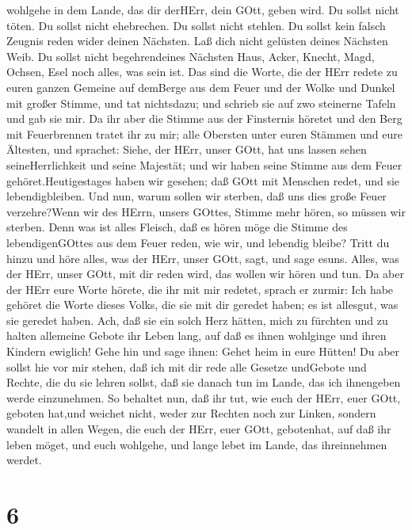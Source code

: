 wohlgehe in dem Lande, das dir derHErr, dein GOtt, geben wird.
 Du sollst nicht töten.  Du sollst nicht
ehebrechen.  Du sollst nicht stehlen.  Du
sollst kein falsch Zeugnis reden wider deinen Nächsten. 
Laß dich nicht gelüsten deines Nächsten Weib. Du sollst nicht
begehrendeines Nächsten Haus, Acker, Knecht, Magd, Ochsen, Esel noch
alles, was sein ist.  Das sind die Worte, die der HErr
redete zu euren ganzen Gemeine auf demBerge aus dem Feuer und der Wolke
und Dunkel mit großer Stimme, und tat nichtsdazu; und schrieb sie auf
zwo steinerne Tafeln und gab sie mir.  Da ihr aber die
Stimme aus der Finsternis höretet und den Berg mit Feuerbrennen tratet
ihr zu mir; alle Obersten unter euren Stämmen und eure Ältesten,
 und sprachet: Siehe, der HErr, unser GOtt, hat uns lassen
sehen seineHerrlichkeit und seine Majestät; und wir haben seine Stimme
aus dem Feuer gehöret.Heutigestages haben wir gesehen; daß GOtt mit
Menschen redet, und sie lebendigbleiben.  Und nun, warum
sollen wir sterben, daß uns dies große Feuer verzehre?Wenn wir des
HErrn, unsers GOttes, Stimme mehr hören, so müssen wir sterben.
 Denn was ist alles Fleisch, daß es hören möge die Stimme
des lebendigenGOttes aus dem Feuer reden, wie wir, und lebendig bleibe?
 Tritt du hinzu und höre alles, was der HErr, unser GOtt,
sagt, und sage esuns. Alles, was der HErr, unser GOtt, mit dir reden
wird, das wollen wir hören und tun.  Da aber der HErr eure
Worte hörete, die ihr mit mir redetet, sprach er zurmir: Ich habe
gehöret die Worte dieses Volks, die sie mit dir geredet haben; es ist
allesgut, was sie geredet haben.  Ach, daß sie ein solch
Herz hätten, mich zu fürchten und zu halten allemeine Gebote ihr Leben
lang, auf daß es ihnen wohlginge und ihren Kindern ewiglich!
 Gehe hin und sage ihnen: Gehet heim in eure Hütten!
 Du aber sollst hie vor mir stehen, daß ich mit dir rede
alle Gesetze undGebote und Rechte, die du sie lehren sollst, daß sie
danach tun im Lande, das ich ihnengeben werde einzunehmen. 
So behaltet nun, daß ihr tut, wie euch der HErr, euer GOtt, geboten
hat,und weichet nicht, weder zur Rechten noch zur Linken, 
sondern wandelt in allen Wegen, die euch der HErr, euer GOtt,
gebotenhat, auf daß ihr leben möget, und euch wohlgehe, und lange lebet
im Lande, das ihreinnehmen werdet.

\hypertarget{section-5}{%
\section{6}\label{section-5}}


